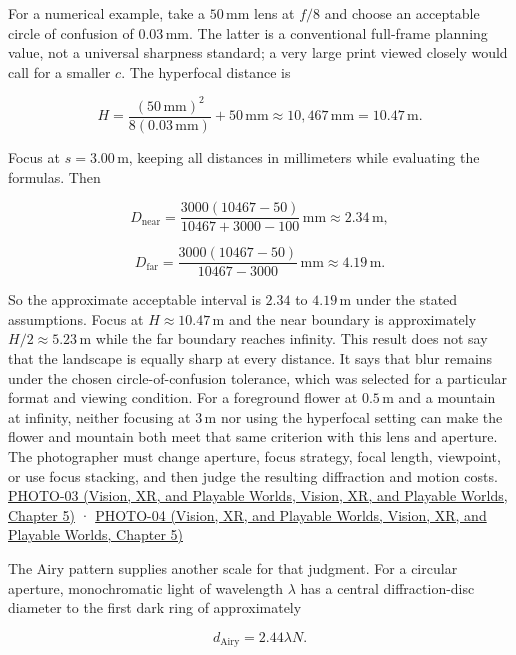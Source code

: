 For a numerical example, take a \(50\,\mathrm{mm}\) lens at \(f/8\) and choose an acceptable circle of confusion of \(0.03\,\mathrm{mm}\). The latter is a conventional full-frame planning value, not a universal sharpness standard; a very large print viewed closely would call for a smaller \(c\). The hyperfocal distance is

\[
H=\frac{(50\,\mathrm{mm})^2}{8(0.03\,\mathrm{mm})}+50\,\mathrm{mm}\approx10{,}467\,\mathrm{mm}=10.47\,\mathrm{m}.
\]

Focus at \(s=3.00\,\mathrm{m}\), keeping all distances in millimeters while evaluating the formulas. Then

\[
D_{\mathrm{near}}=\frac{3000(10467-50)}{10467+3000-100}\,\mathrm{mm}\approx2.34\,\mathrm{m},
\]

\[
D_{\mathrm{far}}=\frac{3000(10467-50)}{10467-3000}\,\mathrm{mm}\approx4.19\,\mathrm{m}.
\]

So the approximate acceptable interval is \(2.34\) to \(4.19\,\mathrm{m}\) under the stated assumptions. Focus at \(H\approx10.47\,\mathrm{m}\) and the near boundary is approximately \(H/2\approx5.23\,\mathrm{m}\) while the far boundary reaches infinity. This result does not say that the landscape is equally sharp at every distance. It says that blur remains under the chosen circle-of-confusion tolerance, which was selected for a particular format and viewing condition. For a foreground flower at \(0.5\,\mathrm{m}\) and a mountain at infinity, neither focusing at \(3\,\mathrm{m}\) nor using the hyperfocal setting can make the flower and mountain both meet that same criterion with this lens and aperture. The photographer must change aperture, focus strategy, focal length, viewpoint, or use focus stacking, and then judge the resulting diffraction and motion costs. \href{../07-Vision-XR-and-Playable-Worlds/main.pdf\#nameddest=04-visual-computing-ii-ch036-photo-03---photography-session-03}{PHOTO-03 (Vision, XR, and Playable Worlds, Vision, XR, and Playable Worlds, Chapter 5)} · \href{../07-Vision-XR-and-Playable-Worlds/main.pdf\#nameddest=04-visual-computing-ii-ch036-photo-04---photography-session-04}{PHOTO-04 (Vision, XR, and Playable Worlds, Vision, XR, and Playable Worlds, Chapter 5)}

The Airy pattern supplies another scale for that judgment. For a circular aperture, monochromatic light of wavelength \(\lambda\) has a central diffraction-disc diameter to the first dark ring of approximately

\[
d_{\mathrm{Airy}}=2.44\lambda N.
\]

